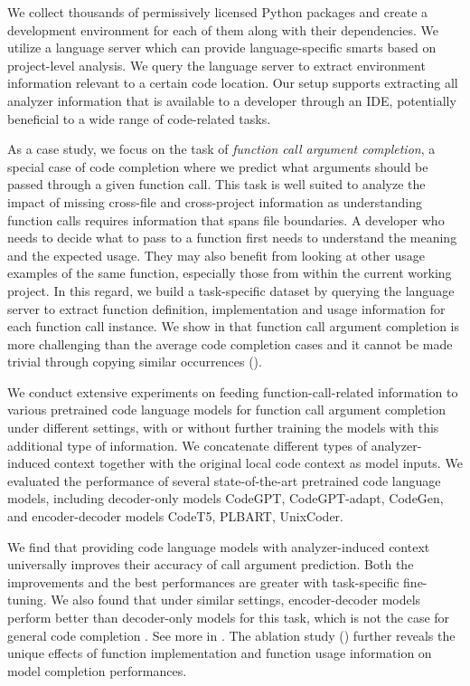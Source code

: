 We collect thousands of permissively licensed Python packages and create a development environment for each of them along with their dependencies. 
We utilize a language server which can provide language-specific smarts based on project-level analysis. 
We query the language server to extract environment information relevant to a certain code location. 
Our setup supports extracting all analyzer information that is available to a developer through an IDE, potentially beneficial to a wide range of code-related tasks. 
\ifaaai
\fi


As a case study, we focus on the task of \emph{function call argument completion}, a special case of code completion where we predict what arguments should be passed through a given function call.
This task is well suited to analyze the impact of missing cross-file and cross-project information as understanding function calls requires information that spans file boundaries.
A developer who needs to decide what to pass to a function first needs to understand the meaning and the expected usage.
They may also benefit from looking at other usage examples of the same function, especially those from within the current working project. 
In this regard, we build a task-specific dataset by querying the language server to extract function definition, implementation and usage information for each function call instance.
We show in  that function call argument completion is more challenging than the average code completion cases and it cannot be made trivial through copying similar occurrences ().

We conduct extensive experiments on feeding function-call-related information to various pretrained code language models for function call argument completion under different settings, with or without further training the models with this additional type of information. 
We concatenate different types of analyzer-induced context together with the original local code context as model inputs.
We evaluated the performance of several state-of-the-art pretrained code language models, including decoder-only models CodeGPT, CodeGPT-adapt, CodeGen, and encoder-decoder models CodeT5, PLBART, UnixCoder. 

We find that providing code language models with analyzer-induced context universally improves their accuracy of call argument prediction.
Both the improvements and the best performances are greater with task-specific fine-tuning.
We also found that under similar settings, encoder-decoder models %
perform better than decoder-only models for this task, which is not the case for general code completion \citep{guo2022unixcoder}. 
See more in .
The ablation study () further reveals the unique effects of function implementation and function usage information on model completion performances.



